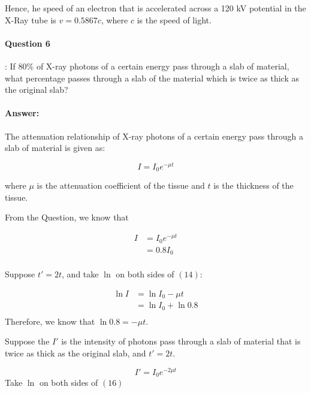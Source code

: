 \documentclass[12pt, letter]{article}
\begin{document}
Hence, he speed of an electron that is accelerated across a 120 kV potential in the X-Ray tube is $v = 0.5867c$, where $c$ is the speed of light.

\paragraph{Question 6}: If 80\% of X-ray photons of a certain energy pass through a slab of material, what percentage passes through a slab of the material which is twice as thick as the original slab?

\paragraph{Answer:}
The attenuation relationship of X-ray photons of a certain energy pass through a slab of material is given as:

\begin{equation}
I = I_0e^{-\mu t}
\end{equation}

where $\mu$ is the attenuation coefficient of the tissue and $t$ is the thickness of the tissue. 

From the Question, we know that

\begin{equation}  \label{eq1}
\begin{split}
    I & = I_0e^{-\mu t} \\
      & = 0.8I_0 \\
\end{split}
\end{equation}


Suppose $t' = 2t$, and take $\ln$ on both sides of $(14)$:


\begin{equation}  \label{eq1}
\begin{split}
    \ln I & = \ln I_0 - \mu t \\
          & = \ln I_0 + \ln0.8 \\
\end{split}
\end{equation}
Therefore, we know that $\ln0.8 = -\mu t$.

Suppose the $I'$ is the intensity of photons pass through a slab of material that is twice as thick as the original slab, and $t' = 2t$.

\begin{equation}
    I' = I_0e^{-2\mu t}
\end{equation}
Take $\ln$ on both sides of $(16)$
\end{document}
